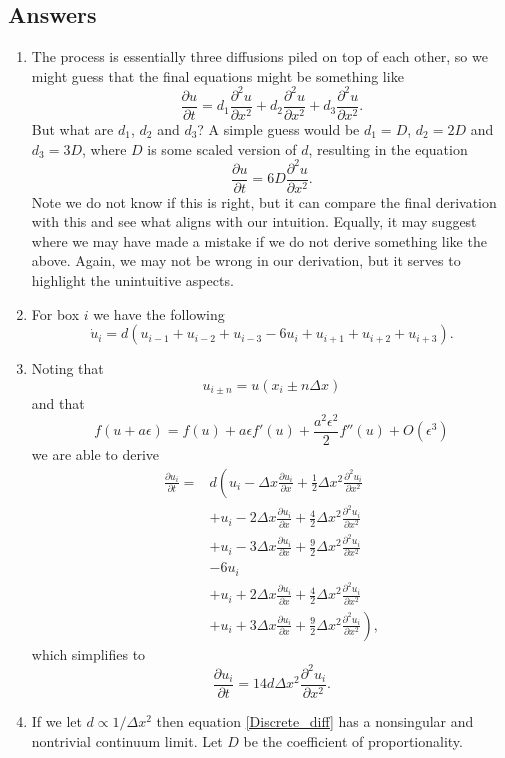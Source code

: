 \documentclass[10pt]{article}
\newcommand{\bb}{\begin{equation}}
\newcommand{\ee}{\end{equation}}
\newcommand{\D}[2]{\frac{\partial #1}{\partial #2}}
\newcommand{\DD}[2]{\frac{\partial^2 #1}{\partial #2^2}}
\newcommand{\eqn}[1]{equation \eqref{#1}}
\renewcommand{\l}{\left(}
\renewcommand{\r}{\right)}
\begin{document}
\begin{Answ}
\subsection{Answers}
\begin{enumerate}
\item \label{Intuition} The process is essentially three diffusions piled on top of each other, so we might guess that the final equations might be something like
\bb
\D{u}{t}=d_1\DD{u}{x}+d_2\DD{u}{x}+d_3\DD{u}{x}.
\ee
But what are $d_1$, $d_2$ and $d_3$? A simple guess would be $d_1=D$, $d_2=2D$ and $d_3=3D$, where $D$ is some scaled version of $d$, resulting in the equation
\bb
\D{u}{t}=6D\DD{u}{x}.
\ee
Note we do not know if this is right, but it can compare the final derivation with this and see what aligns with our intuition. Equally, it may suggest where we may have made a mistake if we do not derive something like the above. Again, we may not be wrong in our derivation, but it serves to highlight the unintuitive aspects.

\item For box $i$ we have the following
\bb
\dot{u}_i=d(u_{i-1}+u_{i-2}+u_{i-3}-6u_i+u_{i+1}+u_{i+2}+u_{i+3}).
\ee

\item Noting that
\bb
u_{i\pm n}=u(x_i\pm n\Delta x)
\ee
and that
\bb
f(u+a\epsilon)=f(u)+a\epsilon f'(u)+\frac{a^2\epsilon^2}{2}f''(u)+O(\epsilon^3)
\ee
we are able to derive
\begin{align}
\D{u_i}{t}=&d\l u_{i}-\Delta x\D{u_i}{x}+\frac{1}{2}\Delta x^2\DD{u_i}{x}\right.\nonumber\\
&+u_{i}-2\Delta x\D{u_i}{x}+\frac{4}{2}\Delta x^2\DD{u_i}{x}\nonumber\\
&+u_{i}-3\Delta x\D{u_i}{x}+\frac{9}{2}\Delta x^2\DD{u_i}{x}\nonumber\\
&-6u_i\nonumber\\
&+u_{i}+2\Delta x\D{u_i}{x}+\frac{4}{2}\Delta x^2\DD{u_i}{x}\nonumber\\
&\left.+u_{i}+3\Delta x\D{u_i}{x}+\frac{9}{2}\Delta x^2\DD{u_i}{x}\r,\nonumber
\end{align}
which simplifies to
\bb
\D{u_i}{t}=14d\Delta x^2\DD{u_i}{x}.\label{Discrete_diff}
\ee

\item If we let $d\propto 1/\Delta x^2$ then \eqn{Discrete_diff} has a nonsingular and nontrivial continuum limit. Let $D$ be the coefficient of proportionality.


\end{enumerate}
\end{Answ}
\end{document}
